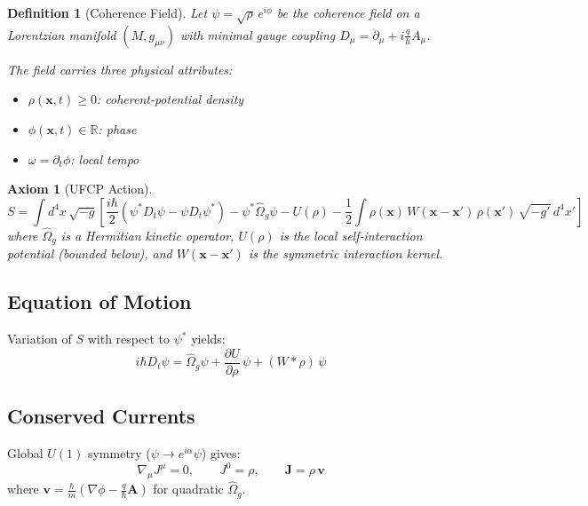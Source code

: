 \documentclass[11pt, a4paper]{article}
\newtheorem{definition}{Definition}[section]
\newtheorem{axiom}{Axiom}[section]
\begin{document}
\begin{definition}[Coherence Field]
Let $\psi = \sqrt{\rho}\, e^{i\phi}$ be the coherence field on a
Lorentzian manifold $(M, g_{\mu\nu})$ with minimal gauge coupling
$D_\mu = \partial_\mu + i\frac{q}{\hbar}A_\mu$.

The field carries three physical attributes:
\begin{itemize}[nosep]
  \item $\rho(\mathbf{x}, t) \geq 0$: coherent-potential density
  \item $\phi(\mathbf{x}, t) \in \mathbb{R}$: phase
  \item $\omega = \partial_t \phi$: local tempo
\end{itemize}
\end{definition}

\begin{axiom}[UFCP Action]
\begin{equation}
  \boxed{
  S = \int d^4x\, \sqrt{-g} \left[
    \frac{i\hbar}{2}\!\left(\psi^* D_t\psi - \psi D_t\psi^*\right)
    - \psi^* \hat{\Omega}_g \psi
    - U(\rho)
    - \frac{1}{2}\int \rho(\mathbf{x})\, W(\mathbf{x}-\mathbf{x}')\,
      \rho(\mathbf{x}')\, \sqrt{-g'}\, d^4x'
  \right]
  }
  \label{eq:action}
\end{equation}
where $\hat{\Omega}_g$ is a Hermitian kinetic operator, $U(\rho)$ is
the local self-interaction potential (bounded below), and
$W(\mathbf{x}-\mathbf{x}')$ is the symmetric interaction kernel.
\end{axiom}

\subsection{Equation of Motion}

Variation of $S$ with respect to $\psi^*$ yields:
\begin{equation}
  \boxed{
  i\hbar D_t \psi = \hat{\Omega}_g \psi
    + \frac{\partial U}{\partial \rho}\,\psi
    + (W * \rho)\,\psi
  }
  \label{eq:eom}
\end{equation}

\subsection{Conserved Currents}

Global $U(1)$ symmetry ($\psi \to e^{i\alpha}\psi$) gives:
\begin{equation}
  \nabla_\mu J^\mu = 0, \qquad
  J^0 = \rho, \qquad
  \mathbf{J} = \rho\, \mathbf{v}
  \label{eq:current}
\end{equation}
where $\mathbf{v} = \frac{\hbar}{m}\!\left(\nabla\phi
- \frac{q}{\hbar}\mathbf{A}\right)$ for quadratic $\hat{\Omega}_g$.
\end{document}
